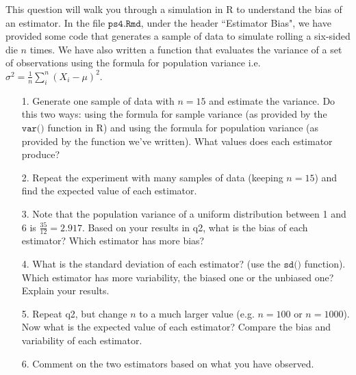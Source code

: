 \documentclass[10pt]{extarticle}
\begin{document}
This question will walk you through a simulation in R to understand the bias of an estimator. In the file $\texttt{ps4.Rmd}$, under the header ``Estimator Bias", we have provided some code that generates a sample of data to simulate rolling a six-sided die $n$ times. We have also written a function that evaluates the variance of a set of observations using the formula for population variance i.e. $\sigma^2 = \frac 1n \sum_i^n (X_i - \mu)^2$. \\ 

\begin{itemize}

    \item[1.] Generate one sample of data with $n=15$ and estimate the variance. Do this two ways: using the formula for sample variance (as provided by the $\texttt{var()}$ function in R) and using the formula for population variance (as provided by the function we've written). What values does each estimator produce? \\ 
    
    \item[2.] Repeat the experiment with many samples of data (keeping $n=15$) and find the expected value of each estimator. \\ 
    \item[3.] Note that the population variance of a uniform distribution between 1 and 6 is $\frac{35}{12} = 2.917$. Based on your results in q2, what is the bias of each estimator? Which estimator has more bias? \\ 
    
    \item[4.] What is the standard deviation of each estimator? (use the $\texttt{sd()}$ function). Which estimator has more variability, the biased one or the unbiased one? Explain your results. \\ 
    
    \item[5.] Repeat q2, but change $n$ to a much larger value (e.g. $n=100$ or $n=1000$). Now what is the expected value of each estimator? Compare the bias and variability of each estimator. \\ 
    
    \item[6.] Comment on the two estimators based on what you have observed.  
    
\end{itemize}




\hfill 
\end{document}
